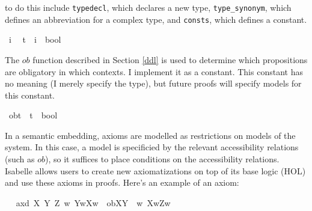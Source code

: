 \begin{isabellebody}
\begin{isamarkuptext}
to do this include \texttt{typedecl}, which declares a new type, \texttt{type\_synonym}, which defines
an abbreviation for a complex type, and \texttt{consts}, which defines a constant.%
\end{isamarkuptext}\isamarkuptrue%
\isamarkupfalse%
\ i\ %
\isanewline
%
\isanewline
\isanewline
{}\isamarkupfalse%
\ t\ {\isacharequal}\ {\isachardoublequoteopen}{\isacharparenleft}i\ {\isasymRightarrow}\ bool{\isacharparenright}{\isachardoublequoteclose}\ %
\isanewline
%
\isanewline
%
\begin{isamarkuptext}%
The $ob$ function described in Section \ref{ddl} is used to determine which propositions are obligatory
in which contexts. I implement it as a constant. This constant has no meaning (I merely specify the type), 
but future proofs will specify models for this constant.%
\end{isamarkuptext}\isamarkuptrue%
\isamarkupfalse%
\ ob{\isacharcolon}{\isacharcolon}{\isachardoublequoteopen}t\ {\isasymRightarrow}\ {\isacharparenleft}t\ {\isasymRightarrow}\ bool{\isacharparenright}{\isachardoublequoteclose}\ \ %
\isanewline
\ %
\isanewline
%
\begin{isamarkuptext}%
In a semantic embedding, axioms are modelled as restrictions on models of the system. In this case,
a model is specificied by the relevant accessibility relations (such as $ob$), so it suffices to place conditions on 
the accessibility relations. Isabelle allows users to create new axiomatizations on top of its base
logic (HOL) and use these axioms in proofs. Here's an example of an axiom:%
\end{isamarkuptext}\isamarkuptrue%
\isamarkupfalse%
\ \isanewline
\ ax{\isacharunderscore}{}d{\isacharcolon}\ {\isachardoublequoteopen}{\isasymforall}X\ Y\ Z{\isachardot}\ {\isacharparenleft}{\isacharparenleft}{\isasymforall}w{\isachardot}\ Y{\isacharparenleft}w{\isacharparenright}{\isasymlongrightarrow}X{\isacharparenleft}w{\isacharparenright}{\isacharparenright}\ {\isasymand}\ ob{\isacharparenleft}X{\isacharparenright}{\isacharparenleft}Y{\isacharparenright}\ {\isasymand}\ {\isacharparenleft}{\isasymforall}w{\isachardot}\ X{\isacharparenleft}w{\isacharparenright}{\isasymlongrightarrow}Z{\isacharparenleft}w{\isacharparenright}{\isacharparenright}{\isacharparenright}\ \isanewline

\end{isabellebody}
